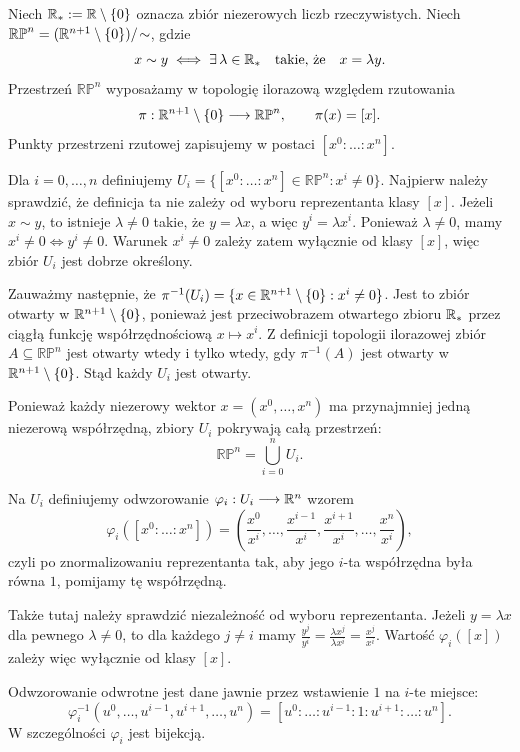 \begin{przyklad}\label{prz:RPn}
Niech $\mathbb{R}_*:=\mathbb{R}\setminus\{0\}$ oznacza zbiór niezerowych
liczb rzeczywistych.
Niech $\mathbb{RP}^n = (\mathbb{R}^{n+1}\setminus\{0\})/\!\sim$,
gdzie
\[
x\sim y
\iff
\exists\,\lambda\in\mathbb{R}_*
\quad\text{takie, że}\quad
x=\lambda y.
\]
Przestrzeń $\mathbb{RP}^n$ wyposażamy w topologię ilorazową względem
rzutowania
\[
\pi:\mathbb{R}^{n+1}\setminus\{0\}\longrightarrow\mathbb{RP}^n,
\qquad
\pi(x)=[x].
\]
Punkty przestrzeni rzutowej zapisujemy w postaci $[x^0:\dots:x^n]$.

Dla $i=0,\dots,n$ definiujemy $U_i = \{[x^0:\dots:x^n]\in\mathbb{RP}^n:x^i\neq0\}$.
Najpierw należy sprawdzić, że definicja ta nie zależy od wyboru
reprezentanta klasy $[x]$. Jeżeli $x\sim y$, to istnieje
$\lambda\neq0$ takie, że $y=\lambda x$, a więc $y^i=\lambda x^i$.
Ponieważ $\lambda\neq0$, mamy $x^i\neq0 \iff y^i\neq0$.
Warunek $x^i\neq0$ zależy zatem wyłącznie od klasy $[x]$, więc zbiór
$U_i$ jest dobrze określony.

Zauważmy następnie, że $\pi^{-1}(U_i) = \{x\in\mathbb{R}^{n+1}\setminus\{0\}:x^i\neq0\}$.
Jest to zbiór otwarty w $\mathbb{R}^{n+1}\setminus\{0\}$, ponieważ jest
przeciwobrazem otwartego zbioru
$\mathbb{R}_*$ przez ciągłą funkcję współrzędnościową $x\longmapsto x^i$.
Z definicji topologii ilorazowej zbiór $A\subseteq\mathbb{RP}^n$
jest otwarty wtedy i tylko wtedy, gdy $\pi^{-1}(A)$ jest otwarty
w $\mathbb{R}^{n+1}\setminus\{0\}$. Stąd każdy $U_i$ jest otwarty.

Ponieważ każdy niezerowy wektor
$x=(x^0,\dots,x^n)$ ma przynajmniej jedną niezerową współrzędną,
zbiory $U_i$ pokrywają całą przestrzeń:
\[
\mathbb{RP}^n
=
\bigcup_{i=0}^n U_i.
\]

Na $U_i$ definiujemy odwzorowanie $\varphi_i:U_i\longrightarrow\mathbb{R}^n$
wzorem
\[
\varphi_i([x^0:\dots:x^n])
=
\left(
\frac{x^0}{x^i},
\dots,
\frac{x^{i-1}}{x^i},
\frac{x^{i+1}}{x^i},
\dots,
\frac{x^n}{x^i}
\right),
\]
czyli po znormalizowaniu reprezentanta tak, aby jego $i$-ta
współrzędna była równa $1$, pomijamy tę współrzędną.

Także tutaj należy sprawdzić niezależność od wyboru reprezentanta.
Jeżeli $y=\lambda x$ dla pewnego $\lambda\neq0$, to dla każdego
$j\neq i$ mamy $\frac{y^j}{y^i} = \frac{\lambda x^j}{\lambda x^i} = \frac{x^j}{x^i}$.
Wartość $\varphi_i([x])$ zależy więc wyłącznie od klasy $[x]$.

Odwzorowanie odwrotne jest dane jawnie przez wstawienie $1$
na $i$-te miejsce:
\[
\varphi_i^{-1}
(u^0,\dots,u^{i-1},u^{i+1},\dots,u^n)
=
[u^0:\dots:u^{i-1}:1:u^{i+1}:\dots:u^n].
\]
W szczególności $\varphi_i$ jest bijekcją.


\end{przyklad}
